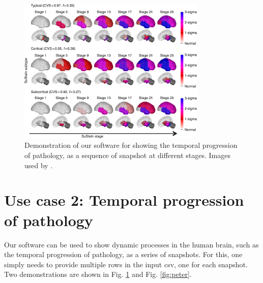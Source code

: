 \documentclass[final,times,twocolumn,authoryear]{elsarticle}
\begin{document}
\begin{figure}[htp]
\centering
 \includegraphics[width=0.8\textwidth, trim=20 0 0 220, clip]{images/young_progression.png}
 \caption{Demonstration of our software for showing the temporal progression of pathology, as a sequence of snapshot at different stages. Images used by \cite{young2018uncovering}.}
  \label{fig:youngProg}
\end{figure}

\section{Use case 2: Temporal progression of pathology}
\label{progression}

Our software can be used to show dynamic processes in the human brain, such as the temporal progression of pathology, as a series of snapshots. For this, one simply needs to provide multiple rows in the input csv, one for each snapshot. Two demonstrations are shown in Fig. \ref{fig:youngProg} and Fig. \ref{fig:peter}.
\end{document}
